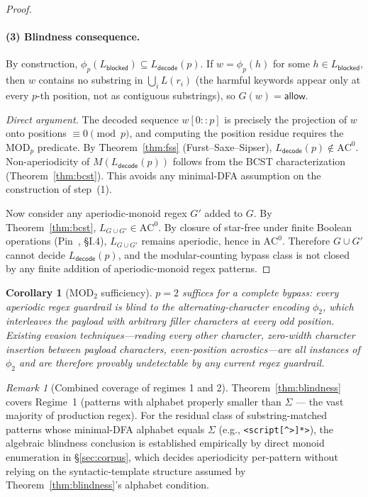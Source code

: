 \documentclass[letterpaper,twocolumn,10pt]{article}
\newtheorem{corollary}[theorem]{Corollary}
\theoremstyle{definition}
\theoremstyle{remark}
\newtheorem{remark}[theorem]{Remark}
\begin{document}
\begin{proof}
\paragraph{(3) Blindness consequence.}
By construction, $\phi_p(L_{\mathsf{blocked}}) \subseteq L_{\mathsf{decode}}(p)$.
If $w = \phi_p(h)$ for some $h \in L_{\mathsf{blocked}}$, then $w$ contains no
substring in $\bigcup_i L(r_i)$ (the harmful keywords appear only at every $p$-th
position, not as contiguous substrings), so $G(w) = \mathsf{allow}$.

\emph{Direct argument.} The decoded sequence $w[0::p]$ is precisely the
projection of $w$ onto positions $\equiv 0 \pmod{p}$, and computing the
position residue requires the $\mathrm{MOD}_p$ predicate. By
Theorem~\ref{thm:fss} (Furst--Saxe--Sipser),
$L_{\mathsf{decode}}(p) \notin \mathrm{AC}^0$. Non-aperiodicity of
$M(L_{\mathsf{decode}}(p))$ follows from the BCST characterization
(Theorem~\ref{thm:bcst}). This avoids any minimal-DFA assumption on the
construction of step~(1).

Now consider any aperiodic-monoid regex $G'$ added to $G$.
By Theorem~\ref{thm:bcst}, $L_{G \cup G'} \in \mathrm{AC}^0$.
By closure of star-free under finite Boolean operations
(Pin~\cite{pin1986}, \S I.4), $L_{G \cup G'}$ remains aperiodic, hence in
$\mathrm{AC}^0$.
Therefore $G \cup G'$ cannot decide $L_{\mathsf{decode}}(p)$, and the
modular-counting bypass class is not closed by any finite addition of
aperiodic-monoid regex patterns.
\end{proof}

\begin{corollary}[$\mathrm{MOD}_2$ sufficiency]\label{cor:parity}
$p = 2$ suffices for a complete bypass: every aperiodic regex guardrail is blind to
the alternating-character encoding $\phi_2$, which interleaves the payload with
arbitrary filler characters at every odd position.
Existing evasion techniques---reading every other character, zero-width character
insertion between payload characters, even-position acrostics---are all instances
of $\phi_2$ and are therefore provably undetectable by any current regex guardrail.
\end{corollary}

\begin{remark}[Combined coverage of regimes 1 and 2]\label{rem:both-regimes}
Theorem~\ref{thm:blindness} covers Regime~1 (patterns with alphabet properly
smaller than $\Sigma$ --- the vast majority of production regex). For the
residual class of substring-matched patterns whose minimal-DFA alphabet equals
$\Sigma$ (e.g., \texttt{<script[\^{}>]*>}), the algebraic blindness conclusion
is established empirically by direct monoid enumeration in
\S\ref{sec:corpus}, which decides aperiodicity per-pattern without relying on
the syntactic-template structure assumed by Theorem~\ref{thm:blindness}'s
alphabet condition.
\end{remark}
\end{document}
